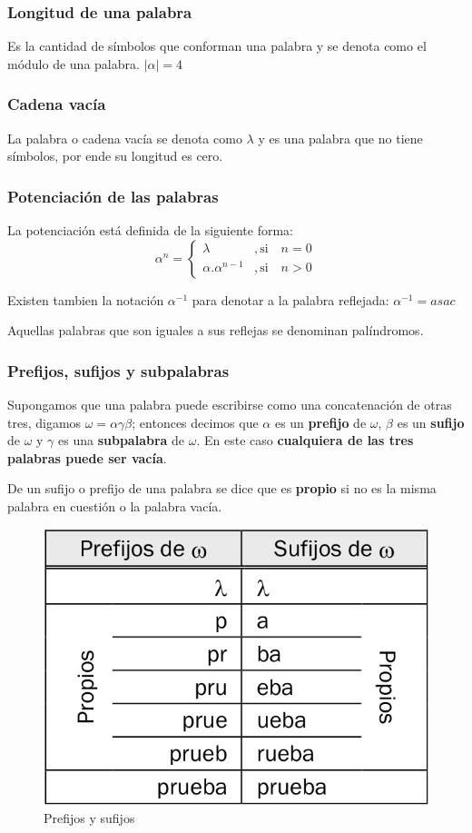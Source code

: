 \documentclass[12pt]{article}
\begin{document}
\subsubsection{Longitud de una palabra}
Es la cantidad de símbolos que conforman una palabra y se denota como el módulo de una palabra. $ \left|\alpha\right| = 4 $

\subsubsection{Cadena vacía}
La palabra o cadena vacía se denota como $ \lambda $ y es una palabra que no tiene símbolos, por ende su longitud es cero.

\subsubsection{Potenciación de las palabras}
La potenciación está definida de la siguiente forma: \[
	\alpha^{n} = \begin{cases}
		\lambda               & , \text{si} \quad n = 0 \\
		\alpha . \alpha^{n-1} & , \text{si} \quad n > 0
	\end{cases}
\]

Existen tambien la notación $ \alpha^{-1} $ para denotar a la palabra reflejada: $ \alpha^{-1} = asac $

Aquellas palabras que son iguales a sus reflejas se denominan palíndromos.

\subsubsection{Prefijos, sufijos y subpalabras}
Supongamos que una palabra puede escribirse como una concatenación de otras tres, digamos $ \omega = \alpha\gamma\beta $; entonces decimos que $ \alpha $ es un \textbf{prefijo} de $ \omega $, $ \beta $ es un \textbf{sufijo} de $ \omega $ y $ \gamma $ es una \textbf{subpalabra} de $ \omega $. En este caso \textbf{cualquiera de las tres palabras puede ser vacía}.

De un sufijo o prefijo de una palabra se dice que es \textbf{propio} si no es la misma palabra en cuestión o la palabra vacía.
\begin{figure}[H]
	\centering
	\includegraphics[width=0.4\linewidth]{imagenes/prefijos_sufijos.png}
	\caption{Prefijos y sufijos}
	\label{fig:prefijos_sufijos}
\end{figure}
\end{document}

